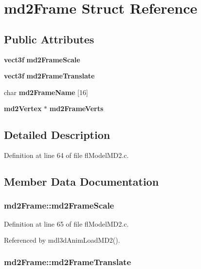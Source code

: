 \section{md2Frame Struct Reference}
\label{structmd2Frame}
\subsection*{Public Attributes}
\begin{CompactItemize}
\item 
{\bf vect3f} {\bf md2Frame\-Scale}
\item 
{\bf vect3f} {\bf md2Frame\-Translate}
\item 
char {\bf md2Frame\-Name} [16]
\item 
{\bf md2Vertex} $\ast$ {\bf md2Frame\-Verts}
\end{CompactItemize}


\subsection{Detailed Description}




Definition at line 64 of file fl\-Model\-MD2.c.

\subsection{Member Data Documentation}
\subsubsection{ {\bf md2Frame::md2Frame\-Scale}}\label{structmd2Frame_cb2e6680b87f5fda3f3b30677dc560c8}




Definition at line 65 of file fl\-Model\-MD2.c.

Referenced by mdl3d\-Anim\-Load\-MD2().
\subsubsection{ {\bf md2Frame::md2Frame\-Translate}}\label{structmd2Frame_269edafc4d1a86bd68bea42fbf984723}




